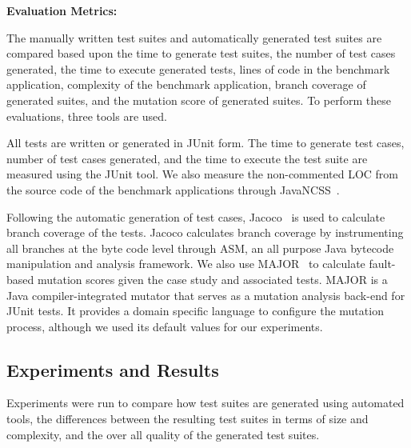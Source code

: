 \noindent \textbf{Evaluation Metrics:}

The manually written test suites and automatically generated test suites are compared based upon the time to generate test suites, the number of test cases generated, the time to execute generated tests, lines of code in the benchmark application, complexity of the benchmark application, branch coverage of generated suites, and the mutation score of generated suites. To perform these evaluations, three tools are used.

All tests are written or generated in JUnit form.  The time to generate test cases, number of test cases generated, and the time to execute the test suite are measured using the JUnit tool.  We also measure the non-commented LOC from the source code of the benchmark applications through JavaNCSS~\cite{leejavancss}.  

Following the automatic generation of test cases, Jacoco~\cite{jacoco} is used to calculate branch coverage of the tests.  Jacoco calculates branch coverage by instrumenting all branches at the byte code level through ASM, an all purpose Java bytecode manipulation and analysis framework. We also use MAJOR~\cite{just2011} to calculate fault-based mutation scores given the case study and associated tests. MAJOR is a Java compiler-integrated mutator that serves as a mutation analysis back-end for JUnit tests.  It provides a domain specific language to configure the mutation process, although we used its default values for our experiments.

\subsection{Experiments and Results}
Experiments were run to compare how test suites are generated using automated tools, the differences between the resulting test suites in terms of size and complexity, and the over all quality of the generated test suites.  

